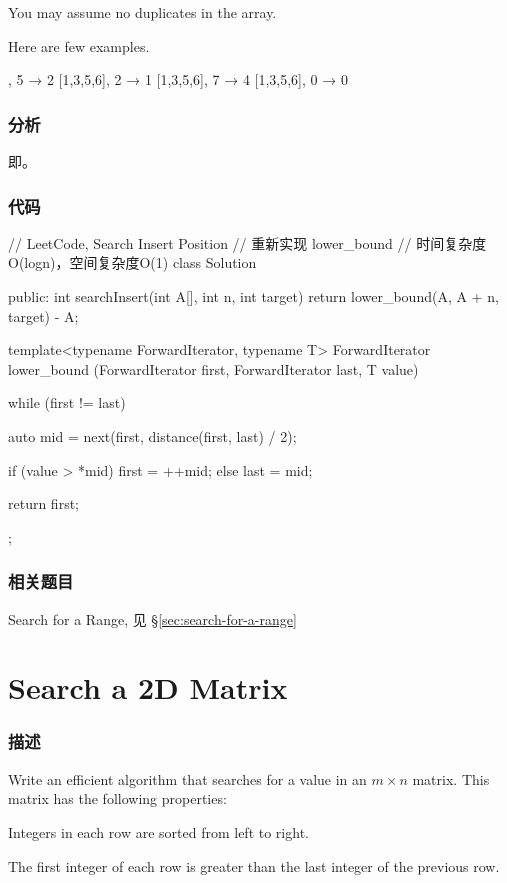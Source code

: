You may assume no duplicates in the array.

Here are few examples.
\begin{Code}
[1,3,5,6], 5 → 2
[1,3,5,6], 2 → 1
[1,3,5,6], 7 → 4
[1,3,5,6], 0 → 0
\end{Code}


\subsubsection{分析}
即。


\subsubsection{代码}
\begin{Code}
// LeetCode, Search Insert Position
// 重新实现 lower_bound
// 时间复杂度O(logn)，空间复杂度O(1)
class Solution {
public:
    int searchInsert(int A[], int n, int target) {
        return lower_bound(A, A + n, target) - A;
    }

    template<typename ForwardIterator, typename T>
    ForwardIterator lower_bound (ForwardIterator first,
            ForwardIterator last, T value) {
        while (first != last) {
            auto mid = next(first, distance(first, last) / 2);

            if (value > *mid)   first = ++mid;
            else                last = mid;
        }

        return first;
    }
};
\end{Code}


\subsubsection{相关题目}
\begindot
\item Search for a Range, 见 \S \ref{sec:search-for-a-range}
\myenddot


\section{Search a 2D Matrix} %
\label{sec:search-a-2d-matrix}


\subsubsection{描述}
Write an efficient algorithm that searches for a value in an $m \times n$ matrix. This matrix has the following properties:
\begindot
\item Integers in each row are sorted from left to right.
\item The first integer of each row is greater than the last integer of the previous row.
\myenddot

